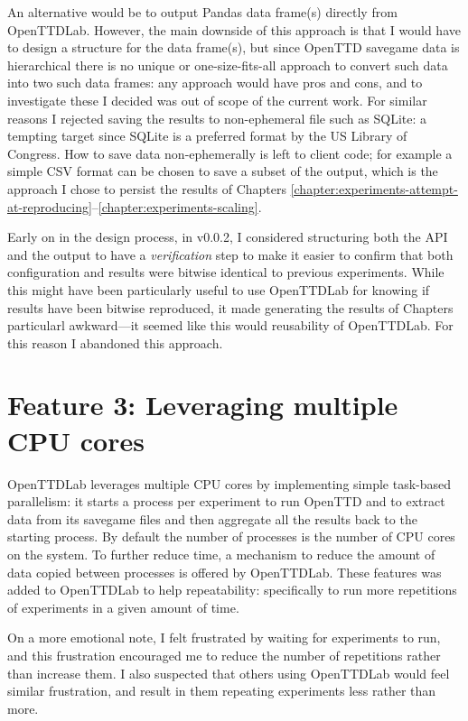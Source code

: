 \documentclass[logo,msc,dsti]{style/infthesis}    %
\begin{document}
{An alternative would be to output Pandas data frame(s) directly from OpenTTDLab. However, the main downside of this approach is that I would have to design a structure for the data frame(s), but since OpenTTD savegame data is hierarchical there is no unique or one-size-fits-all approach to convert such data into two such data frames: any approach would have pros and cons, and to investigate these I decided was out of scope of the current work. For similar reasons I rejected saving the results to non-ephemeral file such as SQLite: a tempting target since SQLite is a preferred format by the US Library of Congress. How to save data non-ephemerally is left to client code; for example a simple CSV format can be chosen to save a subset of the output, which is the approach I chose to persist the results of Chapters \ref{chapter:experiments-attempt-at-reproducing}--\ref{chapter:experiments-scaling}.

Early on in the design process, in v0.0.2, I considered structuring both the API and the output to have a \emph{verification} step to make it easier to confirm that both configuration and results were bitwise identical to previous experiments. While this might have been particularly useful to use OpenTTDLab for knowing if results have been bitwise reproduced, it made generating the results of Chapters  particularl awkward---it seemed like this would reusability of OpenTTDLab. For this reason I abandoned this approach.


\section{Feature 3: Leveraging multiple CPU cores}

OpenTTDLab leverages multiple CPU cores by implementing simple task-based parallelism: it starts a process per experiment to run OpenTTD and to extract data from its savegame files and then aggregate all the results back to the starting process. By default the number of processes is the number of CPU cores on the system.  To further reduce time, a mechanism to reduce the amount of data copied between processes is offered by OpenTTDLab. These features was added to OpenTTDLab to help repeatability: specifically to run more repetitions of experiments in a given amount of time.

On a more emotional note, I felt frustrated by waiting for experiments to run, and this frustration encouraged me to reduce the number of repetitions rather than increase them. I also suspected that others using OpenTTDLab would feel similar frustration, and result in them repeating experiments less rather than more.

}
\end{document}
